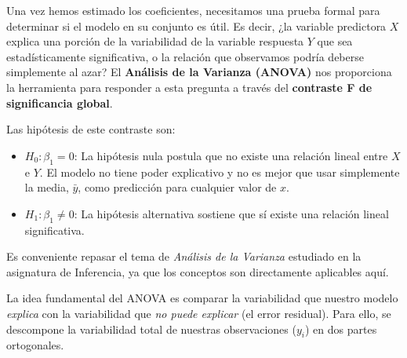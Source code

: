 \documentclass[
  letterpaper,
  DIV=11,
  numbers=noendperiod]{scrreprt}
\providecommand{\tightlist}{%
  \setlength{\itemsep}{0pt}\setlength{\parskip}{0pt}}
\begin{document}
Una vez hemos estimado los coeficientes, necesitamos una prueba formal
para determinar si el modelo en su conjunto es útil. Es decir, ¿la
variable predictora \(X\) explica una porción de la variabilidad de la
variable respuesta \(Y\) que sea estadísticamente significativa, o la
relación que observamos podría deberse simplemente al azar? El
\textbf{Análisis de la Varianza (ANOVA)} nos proporciona la herramienta
para responder a esta pregunta a través del \textbf{contraste F de
significancia global}.

Las hipótesis de este contraste son:

\begin{itemize}
\tightlist
\item
  \(H_0: \beta_1 = 0\): La hipótesis nula postula que no existe una
  relación lineal entre \(X\) e \(Y\). El modelo no tiene poder
  explicativo y no es mejor que usar simplemente la media, \(\bar{y}\),
  como predicción para cualquier valor de \(x\).
\item
  \(H_1: \beta_1 \neq 0\): La hipótesis alternativa sostiene que sí
  existe una relación lineal significativa.
\end{itemize}

\begin{tcolorbox}[enhanced jigsaw, breakable, toprule=.15mm, bottomtitle=1mm, coltitle=black, colbacktitle=quarto-callout-caution-color!10!white, titlerule=0mm, opacitybacktitle=0.6, bottomrule=.15mm, toptitle=1mm, title=\textcolor{quarto-callout-caution-color}{\faFire}\hspace{0.5em}{Repaso}, arc=.35mm, rightrule=.15mm, opacityback=0, colframe=quarto-callout-caution-color-frame, leftrule=.75mm, left=2mm, colback=white]

Es conveniente repasar el tema de \emph{Análisis de la Varianza}
estudiado en la asignatura de Inferencia, ya que los conceptos son
directamente aplicables aquí.

\end{tcolorbox}

La idea fundamental del ANOVA es comparar la variabilidad que nuestro
modelo \emph{explica} con la variabilidad que \emph{no puede explicar}
(el error residual). Para ello, se descompone la variabilidad total de
nuestras observaciones (\(y_i\)) en dos partes ortogonales.
\end{document}
